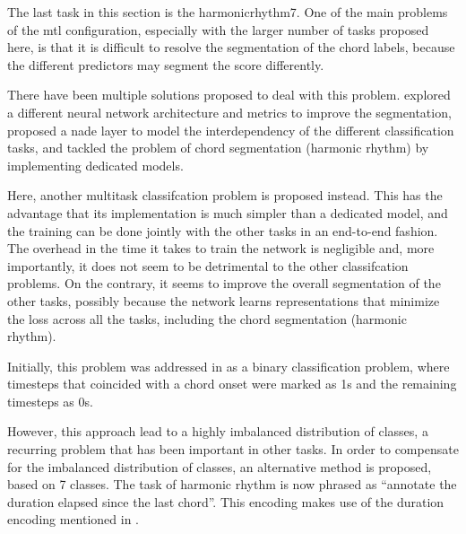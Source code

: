
The last task in this section is the \gls{harmonicrhythm7}.
One of the main problems of the \gls{mtl} configuration,
especially with the larger number of tasks proposed here, is
that it is difficult to resolve the segmentation of the
chord labels, because the different predictors may segment
the score differently.

There have been multiple solutions proposed to deal with
this problem. \textcite{chen2021attend} explored a different
neural network architecture and metrics to improve the
segmentation, \textcite{micchi2021deep} proposed a
\gls{nade} layer to model the interdependency of the
different classification tasks, \textcite{mcleod2021modular}
and  \textcite{wu2021melody} tackled the problem of chord
segmentation (harmonic rhythm) by implementing dedicated
models. 

Here, another multitask classifcation problem is proposed
instead. This has the advantage that its implementation is
much simpler than a dedicated model, and the training can be
done jointly with the other tasks in an end-to-end fashion.
The overhead in the time it takes to train the network is
negligible and, more importantly, it does not seem to be
detrimental to the other classifcation problems. On the
contrary, it seems to improve the overall segmentation of
the other tasks, possibly because the network learns
representations that minimize the loss across all the tasks,
including the chord segmentation (harmonic rhythm).

Initially, this problem was addressed in
\textcite{napoleslopez2021augmentednet} as a binary
classification problem, where timesteps that coincided with
a chord onset were marked as 1s and the remaining timesteps
as 0s.

However, this approach lead to a highly imbalanced
distribution of classes, a recurring problem that has been
important in other tasks. In order to compensate for the
imbalanced distribution of classes, an alternative method is
proposed, based on 7 classes. The task of harmonic rhythm is
now phrased as ``annotate the duration elapsed since the
last chord''. This encoding makes use of the duration
encoding mentioned in .
